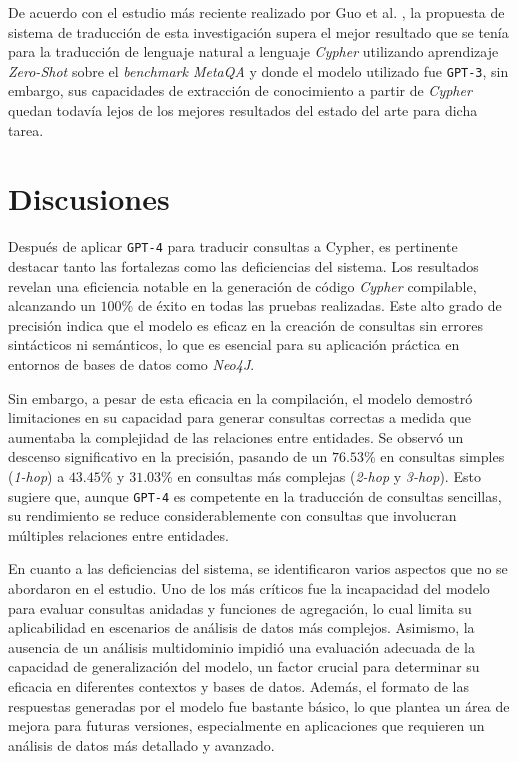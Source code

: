 De acuerdo con el estudio más reciente realizado por Guo et al. \cite{gpt4graphpaper2023}, la propuesta de sistema de traducción de esta investigación supera el mejor resultado que se tenía para la traducción de lenguaje natural a lenguaje \textit{Cypher} utilizando aprendizaje \textit{Zero-Shot} sobre el \textit{benchmark MetaQA} y donde el modelo utilizado fue \texttt{GPT-3}, sin embargo, sus capacidades de extracción de conocimiento a partir de \textit{Cypher} quedan todavía lejos de los mejores resultados del estado del arte para dicha tarea.

\section{Discusiones}

Después de aplicar \texttt{GPT-4} para traducir consultas a Cypher, es pertinente destacar tanto las fortalezas como las deficiencias del sistema. Los resultados revelan una eficiencia notable en la generación de código \textit{Cypher} compilable, alcanzando un $100$\% de éxito en todas las pruebas realizadas. Este alto grado de precisión indica que el modelo es eficaz en la creación de consultas sin errores sintácticos ni semánticos, lo que es esencial para su aplicación práctica en entornos de bases de datos como \textit{Neo4J}.

Sin embargo, a pesar de esta eficacia en la compilación, el modelo demostró limitaciones en su capacidad para generar consultas correctas a medida que aumentaba la complejidad de las relaciones entre entidades. Se observó un descenso significativo en la precisión, pasando de un $76.53$\% en consultas simples (\textit{1-hop}) a $43.45$\% y $31.03$\% en consultas más complejas (\textit{2-hop} y \textit{3-hop}). Esto sugiere que, aunque \texttt{GPT-4} es competente en la traducción de consultas sencillas, su rendimiento se reduce considerablemente con consultas que involucran múltiples relaciones entre entidades.

En cuanto a las deficiencias del sistema, se identificaron varios aspectos que no se abordaron en el estudio. Uno de los más críticos fue la incapacidad del modelo para evaluar consultas anidadas y funciones de agregación, lo cual limita su aplicabilidad en escenarios de análisis de datos más complejos. Asimismo, la ausencia de un análisis multidominio impidió una evaluación adecuada de la capacidad de generalización del modelo, un factor crucial para determinar su eficacia en diferentes contextos y bases de datos. Además, el formato de las respuestas generadas por el modelo fue bastante básico, lo que plantea un área de mejora para futuras versiones, especialmente en aplicaciones que requieren un análisis de datos más detallado y avanzado.
